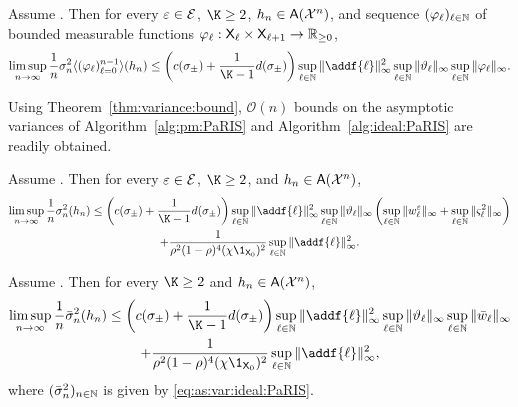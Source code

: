 \begin{theorem} \label{thm:variance:bound}
Assume . 
Then for every $\varepsilon \in \mathcal{E}$, $\K \geq 2$, $h_n \in \mathsf{A}(\mathcal{X}^n)$, and sequence $(\varphi_\ell)_{\ell \in \mathbb{N}}$ of bounded measurable functions $\varphi_\ell : \mathsf{X}_\ell \times \mathsf{X}_{\ell + 1} \to \mathbb{R}_{\geq 0}$, 
$$
\limsup_{n \to \infty} \frac{1}{n} \sigma^2_n \langle (\varphi_\ell)_{\ell = 0}^{n - 1} \rangle (h_n) 
\leq \left( \cbound + \frac{1}{\K - 1} \dbound \right) 
\sup_{\ell \in \nset} \| \addf{\ell} \|_\infty^2 \sup_{\ell \in \nset} \| \adjfuncforward{\ell} \|_\infty \sup_{\ell \in \nset} \| \varphi_\ell \|_\infty.  
$$
\end{theorem}

Using Theorem~\ref{thm:variance:bound}, $\mathcal{O}(n)$ bounds on the asymptotic variances of Algorithm~\ref{alg:pm:PaRIS} and Algorithm~\ref{alg:ideal:PaRIS} are readily obtained. 

\begin{corollary} \label{cor:variance:bound}
Assume . Then for every $\varepsilon \in \mathcal{E}$, $\K \geq 2$, and $h_n \in \mathsf{A}(\mathcal{X}^n)$, 
\begin{multline} \label{eq:variance:bound:full:monty}
\limsup_{n \to \infty} \frac{1}{n} \sigma^2_n(h_n) 
\leq \left( \cbound + \frac{1}{\K - 1} \dbound \right) \sup_{\ell \in \nset} \| \addf{\ell} \|_\infty^2 \sup_{\ell \in \nset} \| \adjfuncforward{\ell} \|_\infty  \left( \sup_{\ell \in \nset} \| \wgtfuncmod{\ell} \|_\infty + \sup_{\ell \in \nset} \| \ukestvar{\ell} \|_\infty \right) \\
+ \frac{1}{\rho^2(1 - \rho)^4 (\chi \1_{\Xset_0})^2} \sup_{\ell \in \nset} \| \addf{\ell} \|_\infty^2. 
\end{multline}
\end{corollary}

\begin{corollary} \label{cor:variance:bound:ideal:PaRIS}
Assume . Then for every $\K \geq 2$ and $h_n \in \mathsf{A}(\mathcal{X}^n)$, 
\begin{multline*}
\limsup_{n \to \infty} \frac{1}{n} \bar{\sigma}^2_n(h_n) \leq  \left( \cbound + \frac{1}{\K - 1} \dbound \right)
\sup_{\ell \in \nset} \| \addf{\ell} \|_\infty^2 \sup_{\ell \in \nset} \| \adjfuncforward{\ell} \|_\infty \sup_{\ell \in \nset} \| \wgtfuncideal{\ell} \|_\infty \\
+ \frac{1}{\rho^2(1 - \rho)^4 (\chi \1_{\Xset_0})^2} \sup_{\ell \in \nset} \| \addf{\ell} \|_\infty^2,  
\end{multline*}
where $(\bar{\sigma}^2_n)_{n \in \mathbb{N}}$ is given by \eqref{eq:as:var:ideal:PaRIS}. 
\end{corollary}

